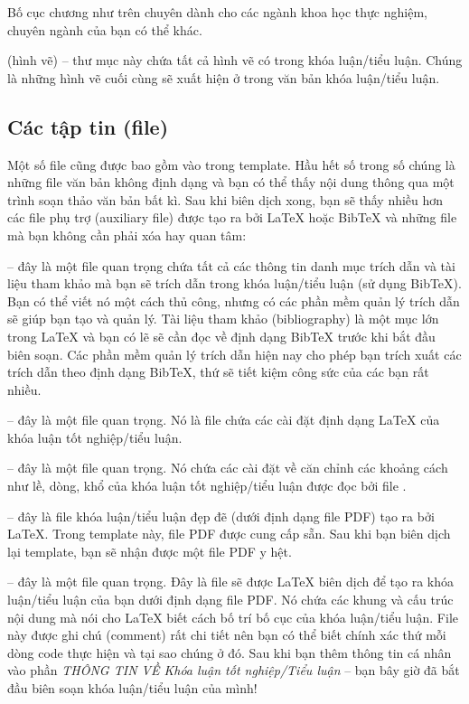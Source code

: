 Bố cục chương như trên chuyên dành cho các ngành khoa học thực nghiệm, chuyên ngành của bạn có thể khác.

 (hình vẽ) -- thư mục này chứa tất cả hình vẽ có trong khóa luận/tiểu luận. Chúng là những hình vẽ cuối cùng sẽ xuất hiện ở trong văn bản khóa luận/tiểu luận.


\subsection{Các tập tin (file)}

Một số file cũng được bao gồm vào trong template. Hầu hết số trong số chúng là những file văn bản không định dạng và bạn có thể thấy nội dung thông qua một trình soạn thảo văn bản bất kì. Sau khi biên dịch xong, bạn sẽ thấy nhiều hơn các file phụ trợ (auxiliary file) được tạo ra bởi \LaTeX{} hoặc BibTeX và những file mà bạn không cần phải xóa hay quan tâm:

 -- đây là một file quan trọng chứa tất cả các thông tin danh mục trích dẫn và tài liệu tham khảo mà bạn sẽ trích dẫn trong khóa luận/tiểu luận (sử dụng BibTeX). Bạn có thể viết nó một cách thủ công, nhưng có các phần mềm quản lý trích dẫn sẽ giúp bạn tạo và quản lý. Tài liệu tham khảo (bibliography) là một mục lớn trong \LaTeX{} và bạn có lẽ sẽ cần đọc về định dạng BibTeX trước khi bắt đầu biên soạn. Các phần mềm quản lý trích dẫn hiện nay cho phép bạn trích xuất các trích dẫn theo định dạng BibTeX, thứ sẽ tiết kiệm công sức của các bạn rất nhiều.

 -- đây là một file quan trọng. Nó là file chứa các cài đặt định dạng \LaTeX{} của khóa luận tốt nghiệp/tiểu luận.

 -- đây là một file quan trọng. Nó chứa các cài đặt về căn chỉnh các khoảng cách như lề, dòng, khổ của khóa luận tốt nghiệp/tiểu luận được đọc bởi file .

 -- đây là file khóa luận/tiểu luận đẹp đẽ (dưới định dạng file PDF) tạo ra bởi \LaTeX{}. Trong template này, file PDF được cung cấp sẵn. Sau khi bạn biên dịch lại template, bạn sẽ nhận được một file PDF y hệt.

 -- đây là một file quan trọng. Đây là file sẽ được \LaTeX{} biên dịch để tạo ra khóa luận/tiểu luận của bạn dưới định dạng file PDF. Nó chứa các khung và cấu trúc nội dung mà nói cho \LaTeX{} biết cách bố trí bố cục của khóa luận/tiểu luận. File này được ghi chú (comment) rất chi tiết nên bạn có thể biết chính xác thứ mỗi dòng code thực hiện và tại sao chúng ở đó. Sau khi bạn thêm thông tin cá nhân vào phần \emph{THÔNG TIN VỀ Khóa luận tốt nghiệp/Tiểu luận} -- bạn bây giờ đã bắt đầu biên soạn khóa luận/tiểu luận của mình!

